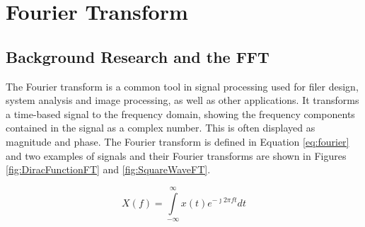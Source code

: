 \section{Fourier Transform}
\subsection{Background Research and the FFT}
The Fourier transform is a common tool in signal processing used for filer design, system analysis and image processing, as well as other applications. It transforms a time-based signal to the frequency domain, showing the frequency components contained in the signal as a complex number. This is often displayed as magnitude and phase. The Fourier transform is defined in Equation \eqref{eq:fourier} and two examples of signals and their Fourier transforms are shown in Figures \ref{fig:DiracFunctionFT} and \ref{fig:SquareWaveFT}. 
 
\begin{equation}\label{eq:fourier}
X(f) = \int\limits_{-\infty}^{\infty}x(t)e^{-\jmath 2 \pi ft}dt
\end{equation}

